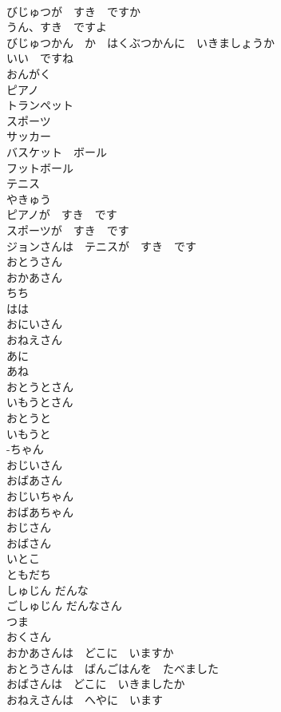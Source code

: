 \documentclass[8pt]{extreport}
\begin{document}
\begin{CJK}{UTF8}{min}
\\	びじゅつが　すき　ですか	
\\	うん、すき　ですよ	
\\	びじゅつかん　か　はくぶつかんに　いきましょうか	
\\	いい　ですね	
\\	おんがく	
\\	ピアノ	
\\	トランペット	
\\	スポーツ	
\\	サッカー	
\\	バスケット　ボール	
\\	フットボール	
\\	テニス	
\\	やきゅう	
\\	ピアノが　すき　です	
\\	スポーツが　すき　です	
\\	ジョンさんは　テニスが　すき　です	
\\	おとうさん	
\\	おかあさん	
\\	ちち	
\\	はは	
\\	おにいさん	
\\	おねえさん	
\\	あに	
\\	あね	
\\	おとうとさん	
\\	いもうとさん	
\\	おとうと	
\\	いもうと	
\\	-ちゃん	
\\	おじいさん	
\\	おばあさん	
\\	おじいちゃん	
\\	おばあちゃん	
\\	おじさん	
\\	おばさん	
\\	いとこ	
\\	ともだち	
\\	しゅじん だんな	
\\	ごしゅじん だんなさん	
\\	つま	
\\	おくさん	
\\	おかあさんは　どこに　いますか	
\\	おとうさんは　ばんごはんを　たべました	
\\	おばさんは　どこに　いきましたか	
\\	おねえさんは　へやに　います	

\end{CJK}
\end{document}
